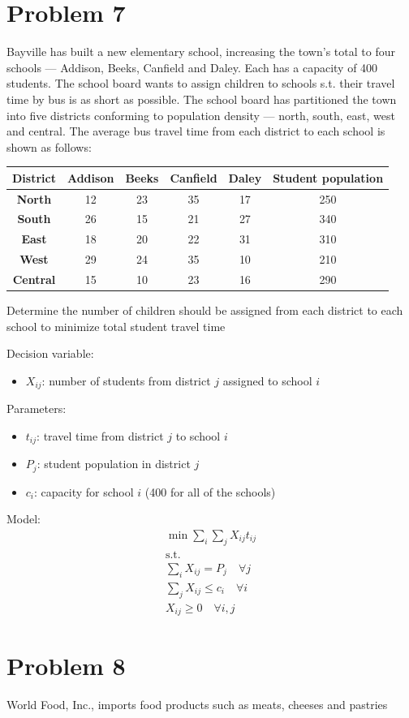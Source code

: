 \documentclass[10pt]{article}
\begin{document}
\section{Problem 7}
Bayville has built a new elementary school, increasing the town's total to four schools --- Addison, Beeks, Canfield and Daley. Each has a capacity of 400 students. The school board wants to assign children to schools s.t. their travel time by bus is as short as possible. The school board has partitioned the town into five districts conforming to population density --- north, south, east, west and central. The average bus travel time from each district to each school is shown as follows: 
\begin{center}
    \begin{tabular}{|c|c|c|c|c|c|}
        \hline 
        \textbf{District} & Addison & Beeks & Canfield & Daley & \textbf{Student population}\\\hline 
        \textbf{North} & 12 & 23 & 35 & 17 & 250\\\hline 
        \textbf{South} & 26 & 15 & 21 & 27 & 340\\\hline 
        \textbf{East} & 18 & 20 & 22 & 31 & 310\\\hline 
        \textbf{West} & 29 & 24 & 35 & 10 & 210\\\hline 
        \textbf{Central} & 15 & 10 & 23 & 16 & 290\\\hline 
    \end{tabular}
\end{center}
Determine the number of children should be assigned from each district to each school to minimize total student travel time

Decision variable: 
\begin{itemize}
    \item $X_{ij} $: number of students from district $j$ assigned to school $i $
\end{itemize}

Parameters: 
\begin{itemize}
    \item $t_{ij} $: travel time from district $j $ to school $i $
    \item $P_j $: student population in district $j $
    \item $c_i $: capacity for school $i $ (400 for all of the schools)
\end{itemize}

Model: 
\begin{gather*}
    \min\sum_i\sum_j X_{ij}t_{ij}\\
    \text{s.t.}\\
    \sum_iX_{ij} = P_j\quad\forall j\\
    \sum_jX_{ij} \le c_i\quad\forall i\\
    X_{ij}\ge 0\quad\forall i, j
\end{gather*}
\newpage 
\section{Problem 8}
World Food, Inc., imports food products such as meats, cheeses and pastries
\end{document}
